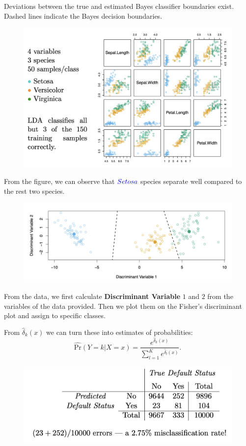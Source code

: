\documentclass{article}
\begin{document}
Deviations between the true and estimated Bayes classifier boundaries exist. Dashed lines indicate the Bayes decision boundaries.

\newpage

\begin{figure}
    \centering
    \includegraphics[width=0.75\linewidth]{Iris_data.png}
    \label{Iris_data}
\end{figure}

From the figure, we can observe that $\color{blue}{Setosa}$ species separate well compared to the rest two species.

\begin{figure}[h!]
    \centering
    \includegraphics[width=0.75\linewidth]{Discriminant_plot.png}
    \label{Discriminant_plot}
\end{figure}

From the data, we first calculate \textbf{Discriminant Variable} $1$ and $2$ from the variables of the data provided. Then we plot them on the Fisher's discriminant plot and assign to specific classes.

From $\hat{\delta}_k(x)$ we can turn these into estimates of probabilities: $$\widehat{\mathrm{Pr}}(Y = k \vert X = x) = \frac{e^{\hat{\delta}_k(x)}}{\sum_{l=1}^K e^{\hat{\delta}_l(x)}}.$$
\newpage
\begin{figure}[h!]
    \centering
    \includegraphics[width=0.75\linewidth]{Credit_data_LDA.png}
    \label{Credit_data_LDA}
\end{figure}
\end{document}
